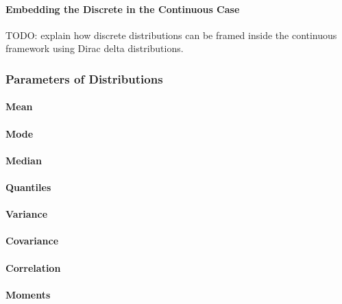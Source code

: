 
\paragraph{Embedding the Discrete in the Continuous Case}
TODO: explain how discrete distributions can be framed inside the continuous framework using Dirac delta distributions. 


\subsubsection{Parameters of Distributions}

\paragraph{Mean}

\paragraph{Mode}

\paragraph{Median}

\paragraph{Quantiles}

\paragraph{Variance}

\paragraph{Covariance}

\paragraph{Correlation}

\paragraph{Moments}



